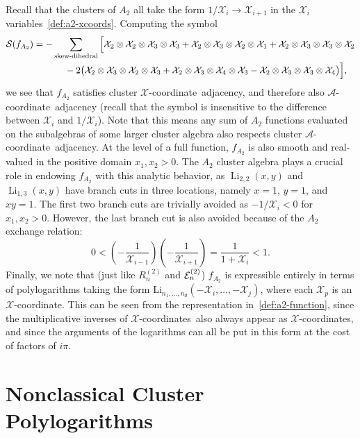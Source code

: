 \documentclass[11pt]{article}
\DeclareMathOperator{\Li}{Li}
\def\x{\mathcal{X}}
\def\xcoord{$\mathcal{X}$-coordinate}
\def\xcoords{$\mathcal{X}$-coordinates}
\def\acoord{$\mathcal{A}$-coordinate}
\begin{document}
Recall that the clusters of $A_2$ all take the form $1/\x_i\to \x_{i+1}$ in the $\x_i$ variables~\eqref{def:a2-xcoords}. Computing the symbol
\begin{align}
   {\cal S}(f_{A_2}) &= -\sum_{\text{skew-dihedral}} \Big[ \x_2\otimes\x_2\otimes\x_3\otimes\x_3+\x_2\otimes\x_3\otimes\x_2\otimes\x_1+\x_2\otimes\x_3\otimes\x_3\otimes\x_2 \nonumber
   \\&\hspace{1.2cm}-2\big(\x_2\otimes\x_3\otimes\x_2\otimes\x_3+\x_2\otimes\x_3\otimes\x_4\otimes\x_3-\x_2\otimes\x_3\otimes\x_3\otimes\x_4 \big) \Big],
\end{align}
we see that $f_{A_2}$ satisfies cluster \xcoord\ adjacency, and therefore also \acoord\ adjacency (recall that the symbol is insensitive to the difference between $\x_i$ and $1/\x_i$). Note that this means any sum of $A_2$ functions evaluated on the subalgebras of some larger cluster algebra also respects cluster \acoord\ adjacency. At the level of a full function, $f_{A_2}$ is also smooth and real-valued in the positive domain $x_1, x_2>0$. The $A_2$ cluster algebra plays a crucial role in endowing $f_{A_2}$ with this analytic behavior, as $\Li_{2,2}(x,y)$ and $\Li_{1,3}(x,y)$ have branch cuts in three locations, namely $x=1$, $y=1$, and $xy=1$. The first two branch cuts are trivially avoided as $-1/\x_i<0$ for $x_1,x_2>0$. However, the last branch cut is also avoided because of the $A_2$ exchange relation: 
\begin{equation}
	0<\left(-\frac{1}{\x_{i-1}}\right)\left(-\frac{1}{\x_{i+1}}\right) = \frac{1}{1+\x_i}<1.
\end{equation}
Finally, we note that (just like $R_n^{(2)}$ and ${\cal E}_n^{(2)}$) $f_{A_2}$ is expressible entirely in terms of polylogarithms taking the form $\text{Li}_{n_1,\dots,n_d}(-\mathcal{X}_i,\dots,-\mathcal{X}_j)$, where each $\x_p$ is an \xcoord. This can be seen from the representation in~\eqref{def:a2-function}, since the multiplicative inverses of \xcoords\ also always appear as \xcoords, and since the arguments of the logarithms can all be put in this form at the cost of factors of $i \pi$.

\section{Nonclassical Cluster Polylogarithms}\label{sec:sub-constructibility} 
\end{document}
